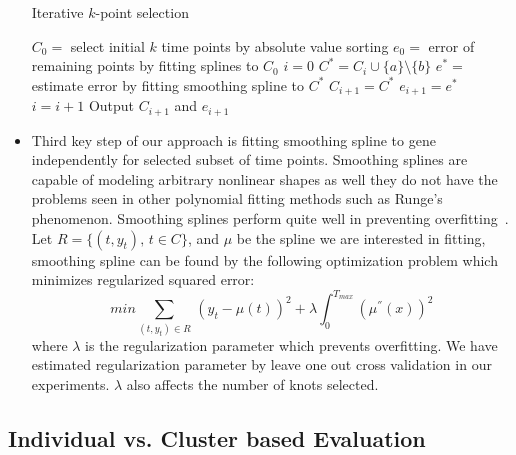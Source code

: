 \documentclass[10pt]{article}
\begin{document}
\begin{itemize}

\begin{algorithm}
\caption{Iterative $k$-point selection}
\label{alg:algo}
\begin{algorithmic}[1]
\State $C_{0} = $ select initial $k$ time points by absolute value sorting
\State $e_{0} = $ error of remaining points by fitting splines to $C_{0}$
\State $i=0$
\Do 
{}
\State $C^{*} = C_{i} \cup \{ a \} \setminus \{b\}$ 
\State $e^{*} = $ estimate error by fitting smoothing spline to $C^{*}$
\State $C_{i+1} = C^{*}$ 
\State $e_{i+1} = e^{*}$
\EndIf
\State $i = i+1$
\EndFor
{}
\State Output $C_{i+1}$ and $e_{i+1}$
\EndProcedure
\end{algorithmic}
\end{algorithm}

\item Third key step of our approach is fitting smoothing spline to gene independently for selected subset of time points. Smoothing
  splines are capable of modeling arbitrary nonlinear shapes as well
  they do not have the problems seen in other polynomial fitting
  methods such as Runge's phenomenon. Smoothing splines perform quite well in preventing overfitting~\cite{wahba1990}. Let
  $R = \{(t, y_{t}),\, t \in C\}$, and $\mu$ be the spline we are interested in fitting, smoothing spline
  can be found by the following optimization problem which minimizes
  regularized squared error:
%
\begin{equation}
min \sum_{(t, y_{t}) \in R} \,(y_{t} - \mu(t))^{2} + \lambda \int_{0}^{T_{max}} (\mu^{''}(x))^{2}
\end{equation}
%
where $\lambda$ is the regularization parameter which prevents overfitting. We have estimated regularization parameter by leave one
out cross validation in our experiments. $\lambda$ also affects the number of knots selected. 

\end{itemize}


\subsection{Individual vs. Cluster based Evaluation}\label{sec:clusteval}
\end{document}
